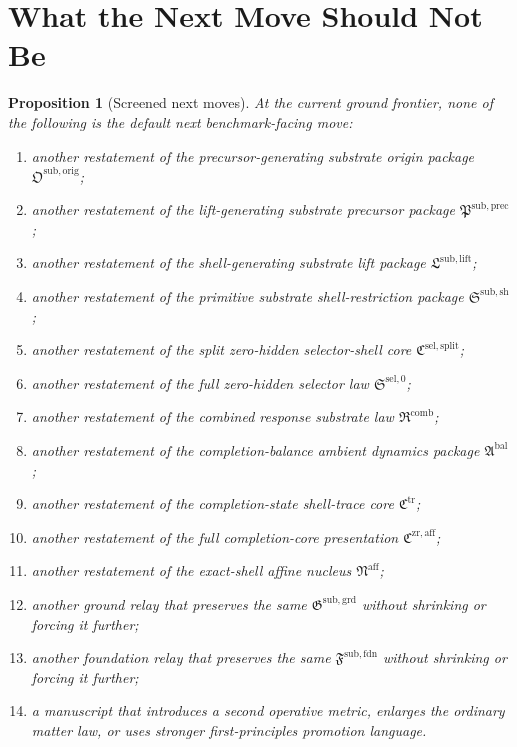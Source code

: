 \documentclass[11pt]{article}
\newcommand{\CompletionCore}{\mathfrak C^{\mathrm{zr,aff}}}
\newcommand{\TraceCore}{\mathfrak C^{\mathrm{tr}}}
\newcommand{\AffineNucleus}{\mathfrak N^{\mathrm{aff}}}
\newcommand{\AmbientPackage}{\mathfrak A^{\mathrm{bal}}}
\newcommand{\CombinedLaw}{\mathfrak R^{\mathrm{comb}}}
\newcommand{\SelectorLaw}{\mathfrak S^{\mathrm{sel},0}}
\newcommand{\SelectorCore}{\mathfrak C^{\mathrm{sel,split}}}
\newcommand{\ShellRestriction}{\mathfrak S^{\mathrm{sub,sh}}}
\newcommand{\LiftPackage}{\mathfrak L^{\mathrm{sub,lift}}}
\newcommand{\PrecursorPackage}{\mathfrak P^{\mathrm{sub,prec}}}
\newcommand{\OriginPackage}{\mathfrak O^{\mathrm{sub,orig}}}
\newcommand{\GroundPackage}{\mathfrak G^{\mathrm{sub,grd}}}
\newcommand{\FoundationPackage}{\mathfrak F^{\mathrm{sub,fdn}}}
\newtheorem{proposition}{Proposition}
\begin{document}
\section{What the Next Move Should Not Be}

\begin{proposition}[Screened next moves]
At the current ground frontier, none of the following is the default next benchmark-facing move:
\begin{enumerate}
    \item another restatement of the precursor-generating substrate origin package \(\OriginPackage\);
    \item another restatement of the lift-generating substrate precursor package \(\PrecursorPackage\);
    \item another restatement of the shell-generating substrate lift package \(\LiftPackage\);
    \item another restatement of the primitive substrate shell-restriction package \(\ShellRestriction\);
    \item another restatement of the split zero-hidden selector-shell core \(\SelectorCore\);
    \item another restatement of the full zero-hidden selector law \(\SelectorLaw\);
    \item another restatement of the combined response substrate law \(\CombinedLaw\);
    \item another restatement of the completion-balance ambient dynamics package \(\AmbientPackage\);
    \item another restatement of the completion-state shell-trace core \(\TraceCore\);
    \item another restatement of the full completion-core presentation \(\CompletionCore\);
    \item another restatement of the exact-shell affine nucleus \(\AffineNucleus\);
    \item another ground relay that preserves the same \(\GroundPackage\) without shrinking or forcing it further;
    \item another foundation relay that preserves the same \(\FoundationPackage\) without shrinking or forcing it further;
    \item a manuscript that introduces a second operative metric, enlarges the ordinary matter law, or uses stronger first-principles promotion language.
\end{enumerate}
\end{proposition}
\end{document}
